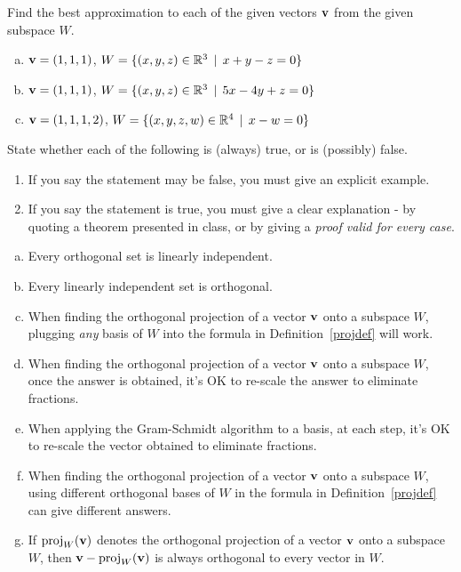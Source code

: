 \begin{prob}
\end{prob} \begin{prob} \label{prob19.5} Find the best approximation to each of the given vectors $\mathbf{v}$ from the given subspace $W$. \medskip
\begin{enumerate}[a)]
\item  $\mathbf{v}=(1,1,1)$,  $W=\{(x,y,z)\in\mathbb{R}^3 \,\mid \, x+y-z=0 \}$
\medskip
%
\item\sov $\mathbf{v}=(1,1,1)$,   $W=\{(x,y,z)\in\mathbb{R}^3 \,\mid \, 5x-4y+z=0 \}$
\medskip
%
\item  $\mathbf{v}=(1,1,1,2)$,   $W=\{(x,y,z, w)\in\mathbb{R}^4 \,\mid \, x-w=0 \}$
\medskip
%
\end{enumerate}
\end{prob} \begin{prob} \label{prob19.6} State whether each of the following is (always) true,
or is (possibly) false.    
   \smallskip    
\begin{enumerate}[$\bullet$]
\item If you say the statement may be false, you    must give an explicit example.   
\item If you say the statement is true, you must give a clear explanation -   by quoting a theorem presented in class, or by giving a {\it proof valid for every  case}. 
\end{enumerate}
\medskip
\begin{enumerate}[a)]
\item Every orthogonal set is linearly independent.
\medskip
%
\item\sov Every linearly independent set is orthogonal.
\medskip
%
\item When finding the orthogonal projection of a vector $\mathbf{v}$ onto a subspace $W$, plugging {\it any} basis of $W$ into the formula in Definition~\ref{projdef} will work. 
\medskip
%
\item\sov When finding the orthogonal projection of a vector $\mathbf{v}$ onto a subspace $W$, once the answer is obtained, it's OK to re-scale the answer to eliminate fractions.
\medskip
%
\item When applying the Gram-Schmidt algorithm to a basis, at each step, it's OK to re-scale the vector obtained to eliminate fractions.
\medskip
% 
\item\sov When finding the orthogonal projection of a vector $\mathbf{v}$ onto a subspace $W$, using different orthogonal bases of $W$ in the formula in Definition~\ref{projdef} can give different answers.
\medskip
%
\item If $\operatorname{proj}_W(\mathbf{v})$ denotes the orthogonal projection of a vector $\mathbf{v}$ onto a subspace $W$, then $\mathbf{v}-\operatorname{proj}_W(\mathbf{v})$ is always orthogonal to every vector in $W$.

\end{enumerate}
\end{prob}
